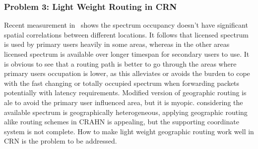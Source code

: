 %

\subsubsection{Problem 3: Light Weight Routing in CRN}

Recent measurement in~\cite{measurement_Palaios14} shows the spectrum occupancy doesn't have significant spatial correlations between different locations.
It follows that licensed spectrum is used by primary users heavily in some areas, whereas in the other areas licensed spectrum is available over longer timespan for secondary users to use.
It is obvious to see that a routing path is better to go through the areas where primary users occupation is lower, as this alleviates or avoids the burden to cope with the fast changing or totally occupied spectrum when forwarding packets potentially with latency requirements.
Modified version of geographic routing is ale to avoid the primary user influenced area, but it is myopic.
considering the available spectrum is geographically heterogeneous, applying geographic routing alike routing schemes in CRAHN is appealing, but the supporting coordinate system is not complete.
How to make light weight geographic routing work well in CRN is the problem to be addressed.







